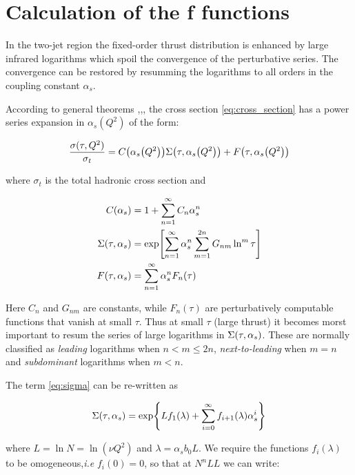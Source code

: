 \documentclass[../main.tex]{subfiles}
\begin{document}

\section{Calculation of the f functions}\label{sec:f functions}

In the two-jet region the fixed-order thrust distribution is enhanced by large infrared
logarithms which spoil the convergence of the perturbative series. The convergence can be
restored by resumming the logarithms to all orders in the coupling constant $\alpha_s$.

According to general theorems \cite{Block:1937},\cite{Kinoshita:1962ur},\cite{Lee:1964is}, 
the cross section \cref{eq:cross_section} has a power series expansion in $\alpha_s(Q^2)$ of the form:

\begin{equation}
    \frac{\sigma(\tau,Q^2)}{\sigma_t} =  C\qty(\alpha_s\qty(Q^2))\Sigma\qty(\tau,\alpha_s\qty(Q^2))+F\qty(\tau,\alpha_s\qty(Q^2))
\end{equation}

where $\sigma_t$ is the total hadronic cross section and    

\begin{align}
    C\qty(\alpha_s) &= 1 + \sum_{n=1}^{\infty} C_n \alpha_s^n \\
    \Sigma\qty(\tau,\alpha_s)&= \exp[\sum_{n=1}^\infty \alpha_s^n \sum_{m=1}^{2n}G_{nm}\ln^m\tau] \label{eq:sigma}\\
    F(\tau,\alpha_s) &= \sum_{n=1}^{\infty} \alpha_s^n F_n(\tau)
\end{align}

Here $C_n$ and $G_{nm}$ are constants, while $F_n(\tau)$ are perturbatively computable functions that vanish at small $\tau$.
Thus at small $\tau$ (large thrust) it becomes morst important to resum the series of large logarithms in $\Sigma\qty(\tau,\alpha_s)$.
These are normally classified as \emph{leading} logarithms when $n < m \le 2n$, \emph{next-to-leading} when $m = n$ 
and \emph{subdominant} logarithms when $m < n$. 

The term \cref{eq:sigma} can be re-written as 

\begin{equation}
    \Sigma\qty(\tau,\alpha_s) = \exp{L f_1(\lambda) + \sum_{i=0}^\infty f_{i+1}(\lambda) \alpha_s^i} 
\end{equation}

where $L = \ln N = \ln(\nu Q^2)$ and $\lambda = \alpha_s b_0 L$.
We require the functions $f_i(\lambda)$ to be omogeneous,\emph{i.e} $f_i(0)=0$, so that at $N^nLL$ we can write:
\end{document}
